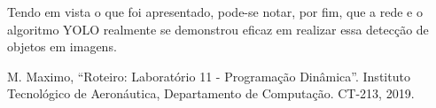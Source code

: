 \documentclass[conference]{IEEEtran}
\begin{document}



Tendo em vista o que foi apresentado, pode-se notar, por fim, que a rede e o algoritmo YOLO realmente se demonstrou eficaz em realizar essa detecção de objetos em imagens.

\begin{thebibliography}{00}
 M. Maximo, ``Roteiro: Laboratório 11 - Programação Dinâmica''. Instituto Tecnológico de Aeronáutica, Departamento de Computação. CT-213, 2019.
\end{thebibliography}
\end{document}
